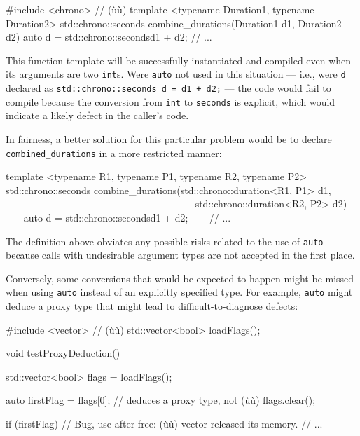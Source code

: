 \begin{emcppslisting}
#include <chrono>  // (ù{}ù)
template <typename Duration1, typename Duration2>
std::chrono::seconds combine_durations(Duration1 d1, Duration2 d2)
{
    auto d = std::chrono::seconds{d1 + d2};
    // ...
}
\end{emcppslisting}
    
\noindent This function template will be successfully instantiated and compiled
even when its arguments are two \lstinline!int!s. Were \lstinline!auto! not
used in this situation --- i.e., were \lstinline!d! declared as
\lstinline!std::chrono::seconds!~\lstinline!d!~\lstinline!=!~\lstinline!d1!~\lstinline!+!~\lstinline!d2;!
--- the code would fail to compile because the conversion from
\lstinline!int! to \lstinline!seconds! is explicit, which would indicate a
likely defect in the caller's code.

In fairness, a better solution for this particular problem would be to declare \lstinline!combined_durations! in a more restricted manner:

\begin{emcppslisting}
template <typename R1, typename P1, typename R2, typename P2>
std::chrono::seconds combine_durations(std::chrono::duration<R1, P1> d1,
                                       std::chrono::duration<R2, P2> d2) {
    auto d = std::chrono::seconds{d1 + d2};
    // ...
}
\end{emcppslisting}


\noindent The definition above obviates any possible risks related to the use of \lstinline!auto! because calls with undesirable argument types are not accepted in the first place. 

Conversely, some conversions that would be expected to happen might be
missed when using \lstinline!auto! instead of an explicitly specified type.
For example, \lstinline!auto! might deduce a proxy type that might lead to
difficult-to-diagnose defects:

\begin{emcppshiddenlisting}[emcppsbatch=e17]
#include <vector>     // (ù{}ù)
std::vector<bool> loadFlags();
\end{emcppshiddenlisting}
\begin{emcppslisting}[emcppsbatch=e17]
void testProxyDeduction()
{
    std::vector<bool> flags = loadFlags();

    auto firstFlag = flags[0];  // deduces a proxy type, not (ù{}ù)
    flags.clear();

    if (firstFlag)  // Bug, use-after-free: (ù{}ù) vector released its memory.
    {
        // ...
    }
}
\end{emcppslisting}
    

